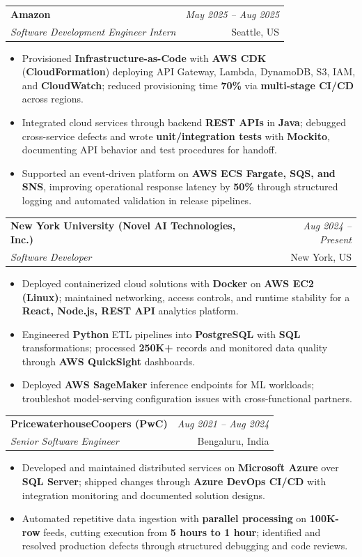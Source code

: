 \documentclass[a4paper,10pt]{article}
\makeatletter
\newcommand{\resumeSubheading}[4]{
\vspace{0.3mm}\item
    \begin{tabular*}{0.98\textwidth}[t]{l@{\extracolsep{\fill}}r}
        \textbf{#1} & \textit{\footnotesize{#4}} \\
        \textit{\footnotesize{#3}} & \footnotesize{#2}\\
    \end{tabular*}\vspace{-2mm}
}
\newcommand{\resumeItemListStart}{\begin{itemize}[leftmargin=*, labelsep=1mm, itemsep=0pt]}
\newcommand{\resumeItemListEnd}{\end{itemize}\vspace{-2mm}}
\makeatother
\begin{document}
\resumeSubheading
{Amazon}{Seattle, US}
{Software Development Engineer Intern}{May 2025 -- Aug 2025}
\resumeItemListStart
\item \footnotesize{Provisioned \textbf{Infrastructure-as-Code} with \textbf{AWS CDK} (\textbf{CloudFormation}) deploying API Gateway, Lambda, DynamoDB, S3, IAM, and \textbf{CloudWatch}; reduced provisioning time \textbf{70\%} via \textbf{multi-stage CI/CD} across regions.}
\item \footnotesize{Integrated cloud services through backend \textbf{REST APIs} in \textbf{Java}; debugged cross-service defects and wrote \textbf{unit/integration tests} with \textbf{Mockito}, documenting API behavior and test procedures for handoff.}
\item \footnotesize{Supported an event-driven platform on \textbf{AWS ECS Fargate, SQS, and SNS}, improving operational response latency by \textbf{50\%} through structured logging and automated validation in release pipelines.}
\resumeItemListEnd

\resumeSubheading
{New York University (Novel AI Technologies, Inc.)}{New York, US}
{Software Developer}{Aug 2024 -- Present}
\resumeItemListStart
\item \footnotesize{Deployed containerized cloud solutions with \textbf{Docker} on \textbf{AWS EC2 (Linux)}; maintained networking, access controls, and runtime stability for a \textbf{React, Node.js, REST API} analytics platform.}
\item \footnotesize{Engineered \textbf{Python} ETL pipelines into \textbf{PostgreSQL} with \textbf{SQL} transformations; processed \textbf{250K+} records and monitored data quality through \textbf{AWS QuickSight} dashboards.}
\item \footnotesize{Deployed \textbf{AWS SageMaker} inference endpoints for ML workloads; troubleshot model-serving configuration issues with cross-functional partners.}
\resumeItemListEnd

\resumeSubheading
{PricewaterhouseCoopers (PwC)}{Bengaluru, India}
{Senior Software Engineer}{Aug 2021 -- Aug 2024}
\resumeItemListStart
\item \footnotesize{Developed and maintained distributed services on \textbf{Microsoft Azure} over \textbf{SQL Server}; shipped changes through \textbf{Azure DevOps CI/CD} with integration monitoring and documented solution designs.}
\item \footnotesize{Automated repetitive data ingestion with \textbf{parallel processing} on \textbf{100K-row} feeds, cutting execution from \textbf{5 hours to 1 hour}; identified and resolved production defects through structured debugging and code reviews.}
\resumeItemListEnd
\end{document}
